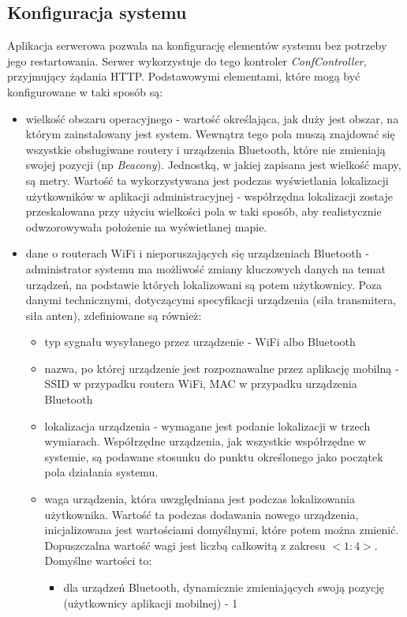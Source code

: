 \subsection{Konfiguracja systemu}
Aplikacja serwerowa pozwala na konfigurację elementów systemu bez potrzeby jego restartowania. Serwer wykorzystuje do tego kontroler \textit{ConfController}, przyjmujący żądania HTTP. Podstawowymi elementami, które mogą być konfigurowane w taki sposób są:
\begin{itemize}
	\item wielkość obszaru operacyjnego - wartość określająca, jak duży jest obszar, na którym zainstalowany jest system. Wewnątrz tego pola muszą znajdować się wszystkie obsługiwane routery i urządzenia Bluetooth, które nie zmieniają swojej pozycji (np \textit{Beacony}). Jednostką, w jakiej zapisana jest wielkość mapy, są metry. Wartość ta wykorzystywana jest podczas wyświetlania lokalizacji użytkowników w aplikacji administracyjnej - współrzędna lokalizacji zostaje przeskalowana przy użyciu wielkości pola w taki sposób, aby realistycznie odwzorowywała położenie na wyświetlanej mapie.
	\item dane o routerach WiFi i nieporuszających się urządzeniach Bluetooth - administrator systemu ma możliwość zmiany kluczowych danych na temat urządzeń, na podstawie których lokalizowani są potem użytkownicy. Poza danymi technicznymi, dotyczącymi specyfikacji urządzenia (siła transmitera, siła anten), zdefiniowane są również:
	\begin{itemize}
		\item typ sygnału wysyłanego przez urządzenie - WiFi albo Bluetooth
		\item nazwa, po której urządzenie jest rozpoznawalne przez aplikację mobilną - SSID w przypadku routera WiFi, MAC w przypadku urządzenia Bluetooth
		\item lokalizacja urządzenia - wymagane jest podanie lokalizacji w trzech wymiarach. Współrzędne urządzenia, jak wszystkie współrzędne w systemie, są podawane stosunku do punktu określonego jako początek pola działania systemu.
		\item waga urządzenia, która uwzględniana jest podczas lokalizowania użytkownika. Wartość ta podczas dodawania nowego urządzenia, inicjalizowana jest wartościami domyślnymi, które potem można zmienić. Dopuszczalna wartość wagi jest liczbą całkowitą z zakresu $<1:4>$. Domyślne wartości to:
		\begin{itemize}
			\item dla urządzeń Bluetooth, dynamicznie zmieniających swoją pozycję (użytkownicy aplikacji mobilnej) - 1

\end{itemize}
\end{itemize}
\end{itemize}
